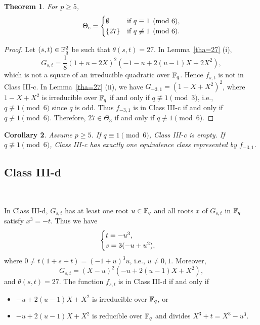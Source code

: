 \documentclass{amsart}
\newtheorem{thm}{Theorem}[section]
\newtheorem{cor}[thm]{Corollary}
\numberwithin{equation}{section}
\theoremstyle{definition}
\newcommand{\f}{\Bbb F}
\begin{document}
\begin{thm}\label{C-tha3}
For $p\ge 5$, 
\[
\Theta_{\rm c}=
\begin{cases}
\emptyset& \text{\rm if}\ q\equiv 1 \pmod 6,\cr
\{27\}& \text{\rm if}\ q\not\equiv 1 \pmod 6.
\end{cases}
\]
\end{thm}

\begin{proof}
Let $(s,t)\in\f_q^2$ be such that $\theta(s,t)=27$.
In Lemma~\ref{tha=27} (i), 
\[
G_{s,t}=\frac 18(1+u-2X)^2(-1-u+2(u-1)X+2X^2),
\]
which is not a square of an irreducible quadratic over $\f_q$. Hence $f_{s,t}$ is not in Class III-c. 
In Lemma~\ref{tha=27} (ii), we have $G_{-3,1}=(1-X+X^2)^2$, where $1-X+X^2$ is irreducible over $\f_q$ if and only if $q\not\equiv 1\pmod 3$, i.e., $q\not\equiv 1\pmod 6$ since $q$ is odd. Thus $f_{-3,1}$ is in Class III-c if and only if $q\not\equiv 1\pmod 6$.
Therefore, $27\in\Theta_3$ if and only if $q\not\equiv 1\pmod 6$.
\end{proof}

\begin{cor}\label{cor:III-d}
Assume $p\ge 5$. If $q\equiv 1\pmod 6$, Class III-c is empty. If $q\not\equiv 1\pmod 6$, Class III-c has exactly one equivalence class represented by $f_{-3,1}$.
\end{cor}


\subsection{Class III-d}\label{sec6.7}\

In Class III-d, $G_{s,t}$ has at least one root $u\in\f_q$ and all roots $x$ of $G_{s,t}$ in $\f_q$ satisfy $x^3=-t$.
Thus we have 
\begin{equation}\label{ts}
\begin{cases}
t=-u^3,\cr
s=3(-u+u^2),
\end{cases}
\end{equation}
where $0\ne t(1+s+t)=(-1+u)^3u$, i.e., $u\ne 0,1$. Moreover,
\[
G_{s,t}=(X-u)^2(-u+2(u-1)X+X^2),
\]
and $\theta(s,t)=27$.
The function $f_{s,t}$ is in Class III-d if and only if
\begin{itemize}
\item[(i)] 
$-u+2(u-1)X+X^2$ is irreducible over $\f_q$, or
\item[(ii)]
$-u+2(u-1)X+X^2$ is reducible over $\f_q$ and divides $X^3+t=X^3-u^3$.
\end{itemize}
\end{document}
